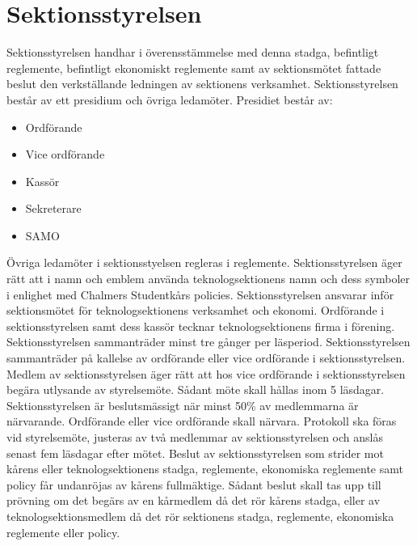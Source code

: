\documentclass[a4paper]{dtek}
\begin{document}
\section{Sektionsstyrelsen}
 Sektionsstyrelsen handhar i överensstämmelse med denna stadga, befintligt reglemente, befintligt ekonomiskt reglemente samt av sektionsmötet fattade beslut den verkställande ledningen av sektionens verksamhet.
\para Sektionsstyrelsen består av ett presidium och övriga ledamöter.
\para Presidiet består av:
\begin{itemize}
\item Ordförande
\item Vice ordförande
\item Kassör
\item Sekreterare
\item SAMO
\end{itemize}
\para Övriga ledamöter i sektionsstyelsen regleras i reglemente.
\para Sektionsstyrelsen äger rätt att i namn och emblem använda teknologsektionens namn och dess symboler i enlighet med Chalmers Studentkårs policies.
\para Sektionsstyrelsen ansvarar inför sektionsmötet för teknologsektionens verksamhet och ekonomi.
\para[Firmateckning] Ordförande i sektionsstyrelsen samt dess kassör tecknar teknologsektionens firma i förening.
\para[Styrelsemötet] Sektionsstyrelsen sammanträder minst tre gånger per läsperiod.
\para Sektionsstyrelsen sammanträder på kallelse av ordförande eller vice ordförande i sektionsstyrelsen.
\para Medlem av sektionsstyrelsen äger rätt att hos vice ordförande i sektionsstyrelsen begära utlysande av styrelsemöte.
\stycke Sådant möte skall hållas inom 5 läsdagar.
\para Sektionsstyrelsen är beslutsmässigt när minst 50\% av medlemmarna är närvarande. Ordförande eller vice ordförande skall närvara.
\para Protokoll ska föras vid styrelsemöte, justeras av två medlemmar av sektionsstyrelsen och anslås senast fem läsdagar efter mötet.
\para[Överklagande] Beslut av sektionsstyrelsen som strider mot kårens eller teknologsektionens stadga, reglemente, ekonomiska reglemente samt policy får undanröjas av kårens fullmäktige.
\stycke Sådant beslut skall tas upp till prövning om det begärs av en kårmedlem då det rör kårens stadga, eller av teknologsektionsmedlem då det rör sektionens stadga, reglemente, ekonomiska reglemente eller policy.

\end{document}
